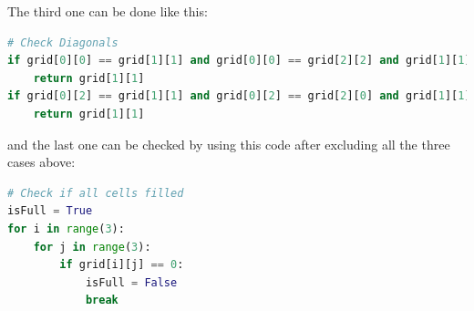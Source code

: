 \documentclass[10pt,xcolor={table,dvipsnames},t]{beamer}
\begin{document}
\begin{frame}[fragile]
  The third one can be done like this:
\begin{lstlisting}[language=python]
# Check Diagonals
if grid[0][0] == grid[1][1] and grid[0][0] == grid[2][2] and grid[1][1] != 0:
    return grid[1][1]
if grid[0][2] == grid[1][1] and grid[0][2] == grid[2][0] and grid[1][1] != 0:
    return grid[1][1]
\end{lstlisting}
and the last one can be checked by using this code after excluding all the three cases above:
\begin{lstlisting}[language=python]
# Check if all cells filled
isFull = True
for i in range(3):
    for j in range(3):
        if grid[i][j] == 0:
            isFull = False
            break
\end{lstlisting}
\end{frame}

\end{document}
